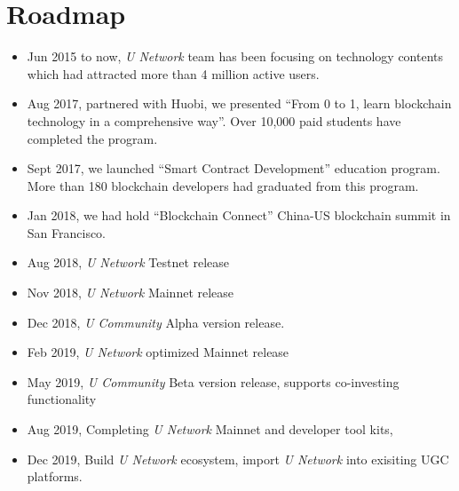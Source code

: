 \section{Roadmap}

	\begin{itemize}

	\item Jun 2015 to now, \emph{U  Network} team has been focusing on technology contents which had attracted more than 4 million active users. 
	\item Aug 2017, partnered with Huobi, we presented ``From 0 to 1, learn blockchain technology in a comprehensive way''. Over 10,000 paid students have completed the program. 
	\item Sept 2017, we launched ``Smart Contract Development'' education program. More than 180 blockchain developers had graduated from this program.    
	\item Jan 2018, we had hold ``Blockchain Connect'' China-US blockchain summit in San Francisco.
	\item Aug 2018, \emph{U  Network} Testnet release
	\item Nov 2018, \emph{U  Network} Mainnet release
	\item Dec 2018, \emph{U Community}  Alpha version release. 
	\item Feb 2019, \emph{U  Network} optimized Mainnet release
	\item May 2019, \emph{U Community} Beta version release, supports co-investing functionality
	\item Aug 2019, Completing \emph{U  Network} Mainnet and developer tool kits,
	\item Dec 2019, Build \emph{U  Network} ecosystem, import \emph{U  Network} into exisiting UGC platforms. 
\end{itemize}